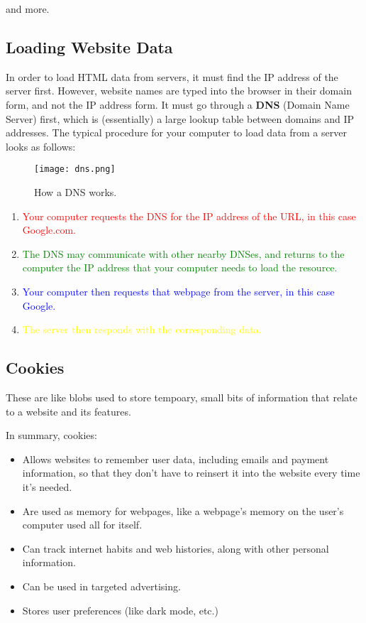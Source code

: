 \documentclass[../main.tex]{subfiles}
\begin{document}
and more.

\subsection{Loading Website Data}

In order to load HTML data from servers, it must find the IP address of the server first. However, website names are typed into the browser in their domain form, and not the IP address form. It must go through a \textbf{DNS} (Domain Name Server) first, which is (essentially) a large lookup table between domains and IP addresses. The typical procedure for your computer to load data from a server looks as follows:

\begin{figure}[H]
    \centering
    \texttt{[image: dns.png]}
    \caption{How a DNS works.}
    \label{fig:dns}
\end{figure}

\begin{enumerate}
    \item \textcolor{red}{Your computer requests the DNS for the IP address of the URL, in this case Google.com.}
    \item \textcolor{green}{The DNS may communicate with other nearby DNSes, and returns to the computer the IP address that your computer needs to load the resource.}
    \item \textcolor{blue}{Your computer then requests that webpage from the server, in this case Google.}
    \item \textcolor{yellow}{The server then responds with the corresponding data.}
\end{enumerate}

\subsection{Cookies}

These are like blobs used to store tempoary, small bits of information that relate to a website and its features.

In summary, cookies:

\begin{itemize}
    \item Allows websites to remember user data, including emails and payment information, so that they don't have to reinsert it into the website every time it's needed.
    \item Are used as memory for webpages, like a webpage's memory on the user's computer used all for itself.
    \item Can track internet habits and web histories, along with other personal information.
    \item Can be used in targeted advertising.
    \item Stores user preferences (like dark mode, etc.)
\end{itemize}
\end{document}

